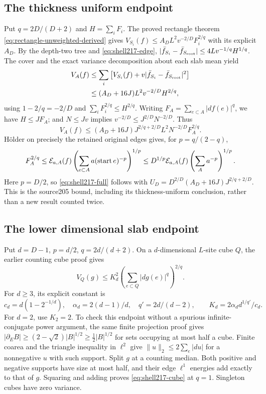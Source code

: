 \subsection{The thickness uniform endpoint}
Put $q=2D/(D+2)$ and $H=\sum_iF_i$. The proved rectangle theorem
\eqref{eq:rectangle-unweighted-derived} gives
$V_{S_i}(f)\leq A_D L^2v^{-2/D}F_i^{2/q}$ with its explicit $A_D$.
By the depth-two tree and \eqref{eq:shell217-edge},
$|\bar f_{S_i}-\bar f_{S_{\rm root}}|\leq4Lv^{-1/q}H^{1/q}$.
The cover and the exact variance decomposition about each slab mean yield
\begin{align*}
 V_A(f)&\leq\sum_i\left[V_{S_i}(f)
                  +v|\bar f_{S_i}-\bar f_{S_{\rm root}}|^2\right]\\
 &\leq (A_D+16J)L^2v^{-2/D}H^{2/q},
\end{align*}
using $1-2/q=-2/D$ and $\sum_iF_i^{2/q}\leq H^{2/q}$.
Writing $F_A=\sum_{e\subset A}|df(e)|^q$, we have $H\leq JF_A$;
and $N\leq Jv$ implies $v^{-2/D}\leq J^{2/D}N^{-2/D}$. Thus
\[
 V_A(f)\leq (A_D+16J)J^{2/q+2/D}L^2N^{-2/D}F_A^{2/q}.
\]
H\"older on precisely the retained original edges gives, for $p=q/(2-q)$,
\begin{equation}\label{eq:shell217-holder}
 F_A^{2/q}\leq\mathcal E_{a,A}(f)
       \left(\sum_{e\subset A}a(\operatorname{start}e)^{-p}\right)^{1/p}
 \leq D^{1/p}\mathcal E_{a,A}(f)\left(\sum_Aa^{-p}\right)^{1/p}.
\end{equation}
Here $p=D/2$, so \eqref{eq:shell217-full} follows with
$U_D=D^{2/D}(A_D+16J)J^{2/q+2/D}$. This is the source205 bound,
including its thickness-uniform conclusion, rather than a new result counted twice.

\subsection{The lower dimensional slab endpoint}
Put $d=D-1$, $p=d/2$, $q=2d/(d+2)$. On a $d$-dimensional $L$-site
cube $Q$, the earlier counting cube proof gives
\begin{equation}\label{eq:shell217-cube}
 V_Q(g)\leq K_d^2\left(\sum_{e\subset Q}|dg(e)|^q\right)^{2/q}.
\end{equation}
For $d\geq3$, its explicit constant is
\[
 c_d=d(1-2^{-1/d}),\quad \alpha_d=2(d-1)/d,\quad q'=2d/(d-2),
 \qquad K_d=2\alpha_d d^{1/q'}/c_d.
\]
For $d=2$, use $K_2=2$. To check this endpoint without a spurious
infinite-conjugate power argument, the same finite projection proof gives
$|\partial_E B|\geq(2-\sqrt2)|B|^{1/2}\geq\tfrac12|B|^{1/2}$
for sets occupying at most half a cube. Finite coarea and the triangle
inequality in $\ell^2$ give $\|u\|_2\leq2\sum_e|du|$ for a nonnegative
$u$ with such support. Split $g$ at a counting median. Both positive and
negative supports have size at most half, and their edge $\ell^1$ energies
add exactly to that of $g$. Squaring and adding proves
\eqref{eq:shell217-cube} at $q=1$. Singleton cubes have zero variance.

